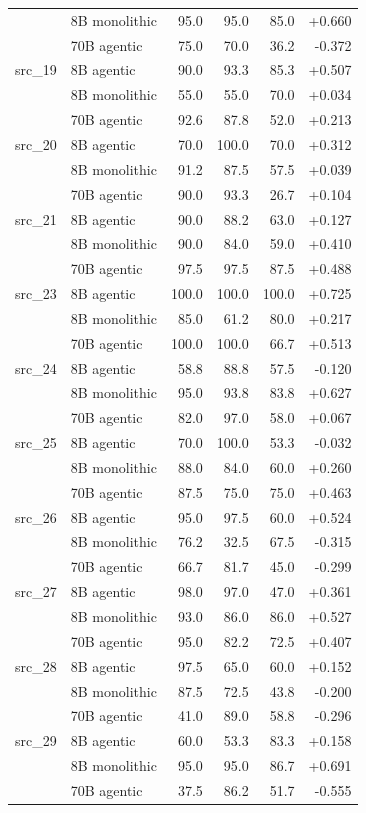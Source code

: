 \begin{longtable}{llrrrr}
 & 8B monolithic & 95.0 & 95.0 & 85.0 & +0.660 \\
 & 70B agentic & 75.0 & 70.0 & 36.2 & -0.372 \\
src\_19 & 8B agentic & 90.0 & 93.3 & 85.3 & +0.507 \\
 & 8B monolithic & 55.0 & 55.0 & 70.0 & +0.034 \\
 & 70B agentic & 92.6 & 87.8 & 52.0 & +0.213 \\
src\_20 & 8B agentic & 70.0 & 100.0 & 70.0 & +0.312 \\
 & 8B monolithic & 91.2 & 87.5 & 57.5 & +0.039 \\
 & 70B agentic & 90.0 & 93.3 & 26.7 & +0.104 \\
src\_21 & 8B agentic & 90.0 & 88.2 & 63.0 & +0.127 \\
 & 8B monolithic & 90.0 & 84.0 & 59.0 & +0.410 \\
 & 70B agentic & 97.5 & 97.5 & 87.5 & +0.488 \\
src\_23 & 8B agentic & 100.0 & 100.0 & 100.0 & +0.725 \\
 & 8B monolithic & 85.0 & 61.2 & 80.0 & +0.217 \\
 & 70B agentic & 100.0 & 100.0 & 66.7 & +0.513 \\
src\_24 & 8B agentic & 58.8 & 88.8 & 57.5 & -0.120 \\
 & 8B monolithic & 95.0 & 93.8 & 83.8 & +0.627 \\
 & 70B agentic & 82.0 & 97.0 & 58.0 & +0.067 \\
src\_25 & 8B agentic & 70.0 & 100.0 & 53.3 & -0.032 \\
 & 8B monolithic & 88.0 & 84.0 & 60.0 & +0.260 \\
 & 70B agentic & 87.5 & 75.0 & 75.0 & +0.463 \\
src\_26 & 8B agentic & 95.0 & 97.5 & 60.0 & +0.524 \\
 & 8B monolithic & 76.2 & 32.5 & 67.5 & -0.315 \\
 & 70B agentic & 66.7 & 81.7 & 45.0 & -0.299 \\
src\_27 & 8B agentic & 98.0 & 97.0 & 47.0 & +0.361 \\
 & 8B monolithic & 93.0 & 86.0 & 86.0 & +0.527 \\
 & 70B agentic & 95.0 & 82.2 & 72.5 & +0.407 \\
src\_28 & 8B agentic & 97.5 & 65.0 & 60.0 & +0.152 \\
 & 8B monolithic & 87.5 & 72.5 & 43.8 & -0.200 \\
 & 70B agentic & 41.0 & 89.0 & 58.8 & -0.296 \\
src\_29 & 8B agentic & 60.0 & 53.3 & 83.3 & +0.158 \\
 & 8B monolithic & 95.0 & 95.0 & 86.7 & +0.691 \\
 & 70B agentic & 37.5 & 86.2 & 51.7 & -0.555 \\
\end{longtable}
